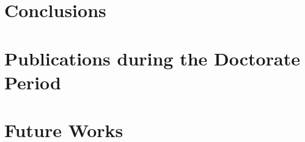 \section{Conclusions}

\section{Publications during the Doctorate Period}



\section{Future Works}
%

